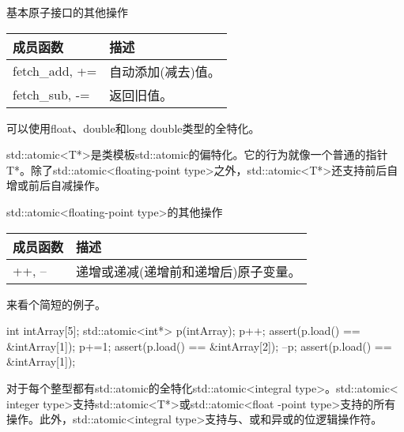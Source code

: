 \begin{center}
基本原子接口的其他操作
\end{center}

\begin{longtable}[c]{|l|l|}
\hline
\textbf{成员函数} & \textbf{描述}                  \\ \hline
\endfirsthead
%
\endhead
%
fetch\_add, +=            & 自动添加(减去)值。 \\ 
fetch\_sub, -=            & 返回旧值。                \\ \hline
\end{longtable}

可以使用float、double和long double类型的全特化。


std::atomic<T*>是类模板std::atomic的偏特化。它的行为就像一个普通的指针T*。除了std::atomic<floating-point type>之外，std::atomic<T*>还支持前后自增或前后自减操作。

\begin{center}
std::atomic<floating-point type>的其他操作
\end{center}

\begin{longtable}[c]{|l|l|}
\hline
\textbf{成员函数} & \textbf{描述}                                          \\ \hline
\endfirsthead
%
\endhead
%
++, --                    & 递增或递减(递增前和递增后)原子变量。 \\ \hline
\end{longtable}

来看个简短的例子。

\begin{cpp}
int intArray[5];
std::atomic<int*> p(intArray);
p++;
assert(p.load() == &intArray[1]);
p+=1;
assert(p.load() == &intArray[2]);
--p;
assert(p.load() == &intArray[1]);
\end{cpp}


对于每个整型都有std::atomic的全特化std::atomic<integral type>。std::atomic< integer type>支持std::atomic<T*>或std::atomic<float -point type>支持的所有操作。此外，std::atomic<integral type>支持与、或和异或的位逻辑操作符。


